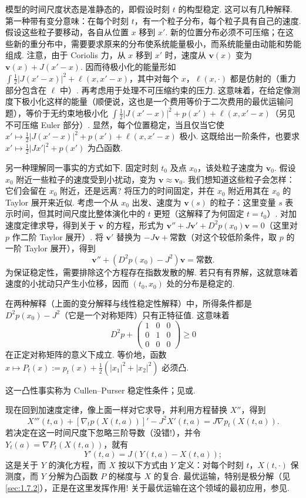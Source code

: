模型的时间尺度状态是准静态的，即假设时刻 $t$ 的构型稳定. 这可以有几种解释. 第一种带有变分意味：在每个时刻 $t$，有一个粒子分布，每个粒子具有自己的速度. 假设这些粒子要移动，各自从位置 $x$ 移到 $x'$. 新的位置分布必须不可压缩；在这些新的重分布中，需要要求原来的分布使系统能量极小，而系统能量由动能和势能组成. 注意，由于 Coriolis 力，从 $x$ 移到 $x'$ 时，速度从 $\mathbf v(x)$ 变为 $\mathbf v(x)+J(x'-x)$. 因而待极小化的能量形如 $\int\frac12|J(x'-x)|^2+\ell(x,x'-x)$，其中对每个 $x$，$\ell(x,\cdot)$ 都是仿射的（重力部分包含在 $\ell$ 中）. 再考虑用于处理不可压缩约束的压力. 这意味着，在给定像测度下极小化这样的能量（顺便说，这也是一个费用等价于二次费用的最优运输问题），等价于无约束地极小化 $\int\frac12|J(x'-x)|^2+p(x')+\ell(x,x'-x)$（另见不可压缩 Euler 部分）. 显然，每个位置稳定，当且仅当它使 $x'\mapsto\frac12|J(x'-x)|^2+p(x')+\ell(x,x'-x)$ 极小. 这既给出一阶条件，也要求 $x'\mapsto\frac12|Jx'|^2+p(x')$ 为凸函数.

另一种理解同一事实的方式如下. 固定时刻 $t_0$ 及点 $x_0$，该处粒子速度为 $\mathbf v_0$. 假设 $x_0$ 附近一些粒子的速度受到小扰动，变为 $\mathbf v\approx\mathbf v_0$. 我们想知道这些粒子会怎样：它们会留在 $x_0$ 附近，还是远离? 将压力的时间固定，并在 $x_0$ 附近用其在 $x_0$ 的 Taylor 展开来近似. 考虑一个从 $x_0$ 出发、速度为 $\mathbf v(s)$ 的粒子：这里变量 $s$ 表示时间，但其时间尺度比整体演化中的 $t$ 更短（这解释了为何固定 $t=t_0$）. 对加速度定律求导，得到关于 $\mathbf v$ 的方程，形式为 $\mathbf v''+J\mathbf v'+D^2p(x_0)\mathbf v=0$（这里对 $p$ 作二阶 Taylor 展开）. 将 $\mathbf v'$ 替换为 $-J\mathbf v+\text{常数}$（对这个较低阶条件，取 $p$ 的一阶 Taylor 展开），得到
\[
\mathbf v''+(D^2p(x_0)-J^2)\mathbf v=\text{常数}.
\]
为保证稳定性，需要排除这个方程存在指数发散的解. 若只有有界解，这就意味着速度的小扰动只产生小位移，因而 $(t_0,x_0)$ 处的分布是稳定的.

在两种解释（上面的变分解释与线性稳定性解释）中，所得条件都是 $D^2p(x_0)-J^2$（它是一个对称矩阵）只有正特征值. 这意味着
\[
D^2p+\begin{pmatrix}1&0&0\\0&1&0\\0&0&0\end{pmatrix}\geq0
\]
在正定对称矩阵的意义下成立. 等价地，函数 $x\mapsto P_t(x):=p_t(x)+\frac12(|x_1|^2+|x_2|^2)$ 必须凸.

这一凸性事实称为 Cullen--Purser 稳定性条件；见\cite{b130}或\cite{b131,b286}.

现在回到加速度定律，像上面一样对它求导，并利用方程替换 $X''$，得到
\[
X'''(t,a)+[\nabla_tp(X(t,a))]'-J^2X'(t,a)=J\nabla p_t(X(t,a)).
\]
若决定在这一时间尺度下忽略三阶导数（没错!），并令 $Y_t(a)=\nabla P_t(X(t,a))$，就有
\[
Y'(t,a)=J(Y(t,a)-X(t,a));
\]
这是关于 $Y$ 的演化方程，而 $X$ 按以下方式由 $Y$ 定义：对每个时刻 $t$，$X(t,\cdot)$ 保测度，而 $Y$ 分解为凸函数 $P$ 的梯度与 $X$ 的复合. 最优运输，特别是极分解（见\autoref{sec:1.7.2}），正是在这里发挥作用! 关于最优运输在这个领域的最初应用，参见\cite{b33}.

